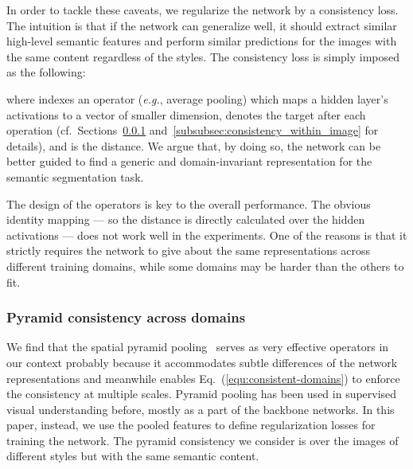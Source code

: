\documentclass[10pt,twocolumn,letterpaper]{article}
\begin{document}
In order to tackle these caveats, we  regularize the network by a consistency loss. The intuition is that if the network can generalize well, it should extract similar high-level semantic features and perform similar predictions for the images with the same content regardless of the styles.  The consistency loss is simply imposed as the following:


where  indexes an operator  (\textit{e.g.}, average pooling) which maps a hidden layer's activations to a vector of smaller dimension,  denotes the target after each operation  (cf.\ Sections~\ref{subsubsec:consistency_across_domains} and~\ref{subsubsec:consistency_within_image} for details), and  is the  distance. We argue that, by doing so, the network can be better guided to find a generic and domain-invariant representation for the semantic segmentation task.


The design of the operators  is key to the overall performance. The obvious identity mapping --- so the  distance is directly calculated over the hidden activations --- does not work well in the experiments. One of the reasons is that it strictly requires the network to give about the same representations across different training domains, while some domains may be harder than the others to fit. 
\vspace{-2mm}
\subsubsection{Pyramid consistency across domains} 
\label{subsubsec:consistency_across_domains}
We find that the spatial pyramid pooling~\cite{he2014spatial, pspnet, pyramid_ori} serves as very effective operators  in our context probably because it accommodates subtle differences of the network representations and meanwhile enables Eq.~(\ref{equ:consistent-domains}) to enforce the consistency at multiple scales. Pyramid pooling has been used in supervised visual understanding before, mostly as a part of the backbone networks. In this paper, instead, we use the pooled features to define regularization losses for training the network. The  pyramid consistency we consider is  over the images of different styles but with the same semantic content. 
\end{document}
